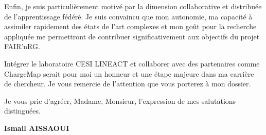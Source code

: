 \documentclass[a4paper,12pt]{article}
\begin{document}
Enfin, je suis particulièrement motivé par la dimension collaborative et distribuée de l'apprentissage fédéré. Je suis convaincu que mon autonomie, ma capacité à assimiler rapidement des états de l'art complexes et mon goût pour la recherche appliquée me permettront de contribuer significativement aux objectifs du projet FAIR'nRG.

Intégrer le laboratoire CESI LINEACT et collaborer avec des partenaires comme ChargeMap serait pour moi un honneur et une étape majeure dans ma carrière de chercheur. Je vous remercie de l'attention que vous porterez à mon dossier.

Je vous prie d'agréer, Madame, Monsieur, l'expression de mes salutations distinguées.

\bigskip

\begin{flushright}
    \textbf{Ismail AISSAOUI}
\end{flushright}
\end{document}
